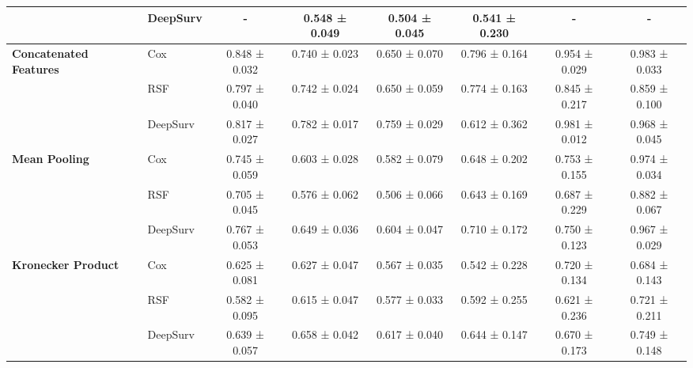 \begin{sidewaystable}[htbp]
\begin{tabular}{@{}llcccccc@{}}
        & DeepSurv & - & 0.548 ± 0.049 & 0.504 ± 0.045 & 0.541 ± 0.230 & - & - \\
        \midrule
        \multirow{3}{*}{\textbf{Concatenated Features}} & Cox & 0.848 ± 0.032 & 0.740 ± 0.023 & 0.650 ± 0.070 & 0.796 ± 0.164 & 0.954 ± 0.029 & 0.983 ± 0.033 \\
        & RSF & 0.797 ± 0.040 & 0.742 ± 0.024 & 0.650 ± 0.059 & 0.774 ± 0.163 & 0.845 ± 0.217 & 0.859 ± 0.100 \\
        & DeepSurv & 0.817 ± 0.027 & 0.782 ± 0.017 & 0.759 ± 0.029 & 0.612 ± 0.362 & 0.981 ± 0.012 & 0.968 ± 0.045 \\
        \midrule
        \multirow{3}{*}{\textbf{Mean Pooling}} & Cox & 0.745 ± 0.059 & 0.603 ± 0.028 & 0.582 ± 0.079 & 0.648 ± 0.202 & 0.753 ± 0.155 & 0.974 ± 0.034 \\
        & RSF & 0.705 ± 0.045 & 0.576 ± 0.062 & 0.506 ± 0.066 & 0.643 ± 0.169 & 0.687 ± 0.229 & 0.882 ± 0.067 \\
        & DeepSurv & 0.767 ± 0.053 & 0.649 ± 0.036 & 0.604 ± 0.047 & 0.710 ± 0.172 & 0.750 ± 0.123 & 0.967 ± 0.029 \\
        \midrule
        \multirow{3}{*}{\textbf{Kronecker Product}} & Cox & 0.625 ± 0.081 & 0.627 ± 0.047 & 0.567 ± 0.035 & 0.542 ± 0.228 & 0.720 ± 0.134 & 0.684 ± 0.143 \\
        & RSF & 0.582 ± 0.095 & 0.615 ± 0.047 & 0.577 ± 0.033 & 0.592 ± 0.255 & 0.621 ± 0.236 & 0.721 ± 0.211 \\
        & DeepSurv & 0.639 ± 0.057 & 0.658 ± 0.042 & 0.617 ± 0.040 & 0.644 ± 0.147 & 0.670 ± 0.173 & 0.749 ± 0.148 \\
        \bottomrule
    \end{tabular}
\end{sidewaystable}

